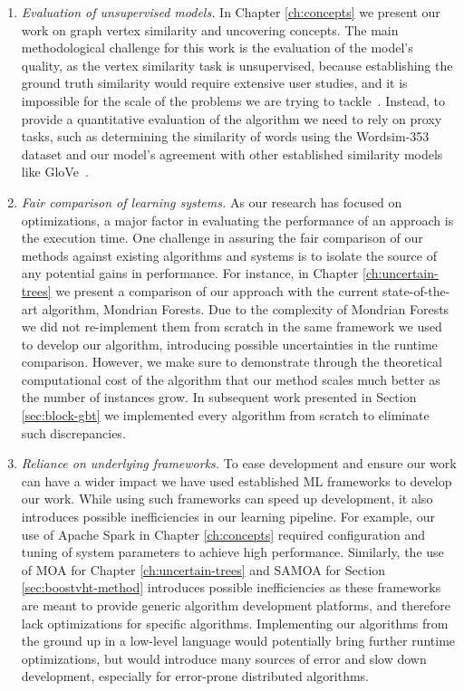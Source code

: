 \begin{enumerate}
	\item \emph{Evaluation of unsupervised models.} In Chapter \ref{ch:concepts} we present our
	work on graph vertex similarity and uncovering concepts. The main methodological
	challenge for this work is the evaluation of the model's quality, as the vertex
	similarity task is unsupervised, because establishing the ground truth similarity would
	require extensive user studies, and it is impossible for the scale of the problems
	we are trying to tackle~\cite{simrank}. Instead, to provide a quantitative evaluation
	of the algorithm we need to rely on proxy tasks, such as determining the similarity
	of words using the Wordsim-353 dataset \cite{wordsim} and our model's agreement
	with other established similarity models like GloVe~\cite{glove}.

	\item \emph{Fair comparison of learning systems.} As our research has focused on optimizations,
	a major factor in evaluating the performance of an approach is the execution time. One challenge
	in assuring the fair comparison of our methods against existing algorithms and systems is to isolate
	the source of any potential gains in performance. For instance, in Chapter
	\ref{ch:uncertain-trees} we present a comparison of our approach with the current
	state-of-the-art algorithm, Mondrian Forests. Due to the complexity of Mondrian Forests
	we did not re-implement them from scratch in the same framework we used to develop our
	algorithm, introducing possible uncertainties in the runtime comparison.
	However, we make sure to demonstrate through the theoretical computational cost of the
	algorithm that our method scales much better as the number of instances grow.
	In subsequent work presented in Section \ref{sec:block-gbt} we implemented every
	algorithm from scratch to eliminate such discrepancies.

	\item \emph{Reliance on underlying frameworks.} To ease development and ensure
	our work can have a wider impact we have used established ML frameworks to develop
	our work. While using such frameworks can speed up development, it also introduces possible inefficiencies
	in our learning pipeline. For example, our use of Apache Spark \cite{spark}
	in Chapter \ref{ch:concepts} required configuration and tuning of system
	parameters to achieve high performance. Similarly, the use of MOA for
	Chapter \ref{ch:uncertain-trees} and SAMOA for Section \ref{sec:boostvht-method}
	introduces possible inefficiencies as these frameworks are meant to provide
	generic algorithm development platforms, and therefore lack optimizations for specific algorithms. Implementing our algorithms from the
	ground up in a low-level language would potentially bring further runtime
	optimizations, but would introduce many sources of error and slow down development, especially
	for error-prone distributed algorithms.
\end{enumerate}

